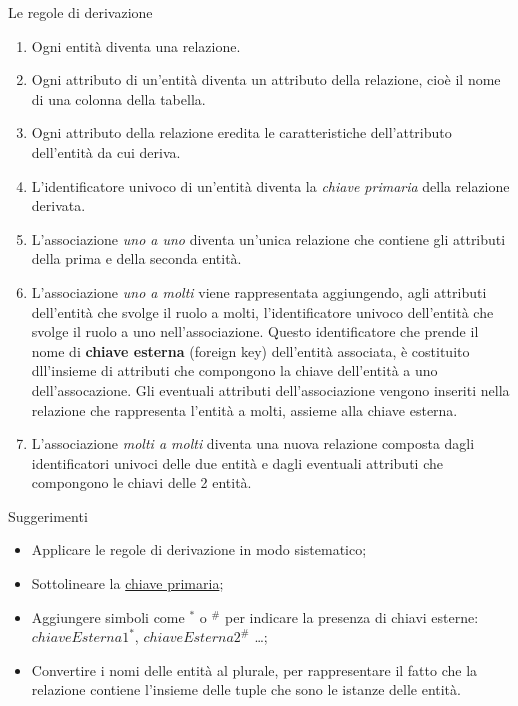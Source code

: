 %
\begin{frame}[allowframebreaks]{Le regole di derivazione}
\begin{enumerate}
    \item Ogni entit\`a diventa una relazione.
    \item Ogni attributo di un'entit\`a diventa un attributo della relazione, cio\`e il nome di una colonna della tabella.
    \item Ogni attributo della relazione eredita le caratteristiche dell'attributo dell'entit\`a da cui deriva.
    \item L'identificatore univoco di un'entit\`a diventa la \textit{chiave primaria} della relazione derivata.
    \item L'associazione \textit{uno a uno} diventa un'unica relazione che contiene gli attributi della prima e della seconda entit\`a.
    \item L'associazione \textit{uno a molti} viene rappresentata aggiungendo, agli attributi dell'entit\`a che svolge il ruolo a molti, l'identificatore univoco dell'entit\`a che svolge il ruolo a uno nell'associazione. Questo identificatore che prende il nome di \textbf{chiave esterna} (foreign key) dell'entit\`a associata, \`e costituito dll'insieme di attributi che compongono la chiave dell'entit\`a a uno dell'assocazione. Gli eventuali attributi dell'associazione vengono inseriti nella relazione che rappresenta l'entit\`a a molti, assieme alla chiave esterna.
    \item L'associazione \textit{molti a molti} diventa una nuova relazione composta dagli identificatori univoci delle due entit\`a e dagli eventuali attributi che compongono le chiavi delle 2 entit\`a.
\end{enumerate}
\end{frame}
%
\begin{frame}{Suggerimenti}
\begin{itemize}[<+->]
    \item Applicare le regole di derivazione in modo sistematico;
    \item Sottolineare la \underline{chiave primaria};
    \item Aggiungere simboli come $^*$ o $^\#$ per indicare la presenza di chiavi esterne: $chiaveEsterna1^*$, $chiaveEsterna2^\#$ \ldots;
    \item Convertire i nomi delle entit\`a al plurale, per rappresentare il fatto che la relazione contiene l'insieme delle tuple che sono le istanze delle entit\`a.
\end{itemize}
\end{frame}
